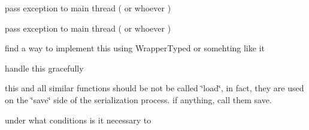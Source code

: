 
\begin{DoxyRefList}
\item[\label{todo__todo000011}%
\hypertarget{todo__todo000011}{}%
\-Member \hyperlink{classgal_1_1network_1_1communicating_abd5efaa6563dda2097f69ae3679f87a1}{gal\-:\-:network\-:\-:communicating\-:\-:thread\-\_\-read} ()]pass exception to main thread ( or whoever )  
\item[\label{todo__todo000010}%
\hypertarget{todo__todo000010}{}%
\-Member \hyperlink{classgal_1_1network_1_1communicating_a271caa9e5d4d13fffda9d38218231b2c}{gal\-:\-:network\-:\-:communicating\-:\-:thread\-\_\-write} (boost\-::shared\-\_\-ptr$<$ message $>$)]pass exception to main thread ( or whoever )  
\item[\label{todo__todo000008}%
\hypertarget{todo__todo000008}{}%
\-Class \hyperlink{structglutpp_1_1network_1_1actor_1_1update_1_1addr__raw}{glutpp\-:\-:network\-:\-:actor\-:\-:update\-:\-:addr\-\_\-raw} ]find a way to implement this using \-Wrapper\-Typed or somehting like it  
\item[\label{todo__todo000009}%
\hypertarget{todo__todo000009}{}%
\-Member \hyperlink{structglutpp_1_1network_1_1actor_1_1update_1_1addr__raw_a4883db7c0b5227e0fcb124f786a121c1}{glutpp\-:\-:network\-:\-:actor\-:\-:update\-:\-:addr\-\_\-raw\-:\-:load} (\-Archive \&ar, unsigned int const \&version)]handle this gracefully  
\item[\label{todo__todo000007}%
\hypertarget{todo__todo000007}{}%
\-Member \hyperlink{structglutpp_1_1network_1_1actor_1_1update_a2a7bee8209aa582266f5bb4e6e729501}{glutpp\-:\-:network\-:\-:actor\-:\-:update\-:\-:load} (\-Neb\-::weak\-\_\-ptr$<$ glutpp\-::actor\-::actor $>$ const \&actor)]this and all similar functions should be not be called \char`\"{}load\char`\"{}, in fact, they are used on the \char`\"{}save\char`\"{} side of the serialization process. if anything, call them save.  
\item[\label{todo__todo000006}%
\hypertarget{todo__todo000006}{}%
\-Namespace \hyperlink{namespaceNeb}{\-Neb} ]under what conditions is it necessary to 


\end{DoxyRefList}
